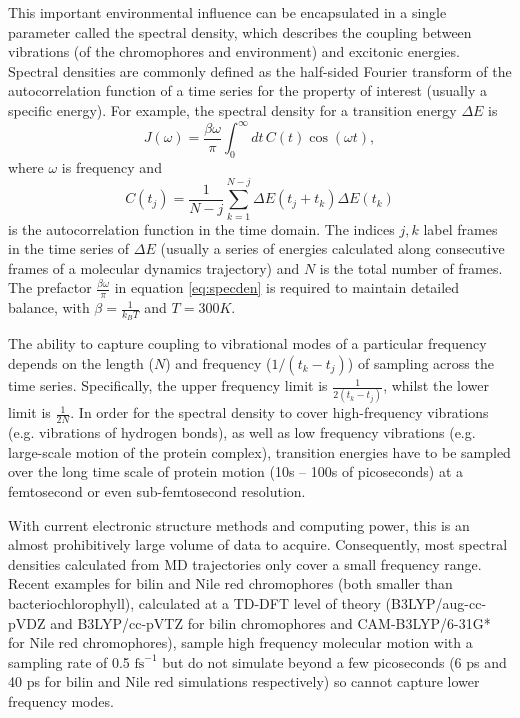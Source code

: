 This important environmental influence can be encapsulated in a single parameter 
called the spectral density, which describes the coupling between vibrations (of 
the chromophores and environment) and excitonic energies. Spectral densities are
commonly defined as the half-sided Fourier transform of the autocorrelation function 
of a time series for the property of interest (usually a specific energy). For example,
the spectral density for a  transition energy $\Delta E$ is 
\begin{equation}
    J\left(\omega\right) = \frac{\beta \omega}{\pi} \int^\infty_0 dt \, C\left(t\right) \cos \left(\omega t\right), \label{eq:specden}
\end{equation}
%
where $\omega$ is frequency and 
\begin{equation}
    C\left(t_j\right) = \frac{1}{N-j} \sum^{N-j}_{k=1} \Delta E \left(t_j + t_k\right) \Delta E \left(t_k\right)
\end{equation}
%
is the autocorrelation function in the time domain. The indices $j,k$ label frames
in the time series of $\Delta E$ (usually a series of energies calculated along 
consecutive frames of a molecular dynamics trajectory) and $N$ is the total number 
of frames. The prefactor $\frac{\beta \omega}{\pi}$ in equation \ref{eq:specden} 
is required to maintain detailed balance, with $\beta = \frac{1}{k_B T}$ and $T= 300 K$.

The ability to capture coupling to vibrational modes of a particular frequency depends 
on the length ($N$) and frequency ($1 / \left(t_k-t_j\right)$) of sampling across 
the time series. Specifically, the upper frequency limit is $\frac{1}{2\left(t_k-t_j\right)}$, 
whilst the lower limit is $\frac{1}{2N}$. In order for the spectral density to cover 
high-frequency vibrations (e.g. vibrations of hydrogen bonds), as well as low frequency 
vibrations (e.g. large-scale motion of the protein complex), transition energies 
have to be sampled over the long time scale of protein motion (10s -- 100s of picoseconds)
at a femtosecond or even sub-femtosecond resolution.

With current electronic structure methods and computing power, this is an almost 
prohibitively large volume of data to acquire. Consequently, most spectral densities
calculated from MD trajectories only cover a small frequency range. Recent examples 
for bilin \cite{Blau2018} and Nile red chromophores \cite{Zuehlsdorff2022} (both 
smaller than bacteriochlorophyll), calculated at a TD-DFT level of theory (B3LYP/aug-cc-pVDZ 
and B3LYP/cc-pVTZ for bilin chromophores and CAM-B3LYP/6-31G* for Nile red chromophores), 
sample high frequency molecular motion with a sampling rate of 0.5 $\mathrm{fs}^{-1}$ 
but do not simulate beyond a few picoseconds (6 ps and 40 ps for bilin and Nile red 
simulations respectively) so cannot capture lower frequency modes.

